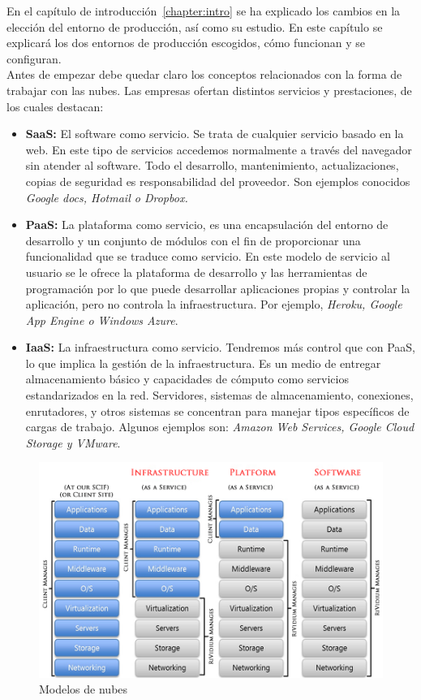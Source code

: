 
En el capítulo de introducción~\ref{chapter:intro} se ha explicado los cambios en la elección del entorno de producción, así como su estudio. En este capítulo se explicará los dos entornos de producción escogidos, cómo funcionan y se configuran. \\

Antes de empezar debe quedar claro los conceptos relacionados con la forma de trabajar con las nubes. Las empresas ofertan distintos servicios y prestaciones, de los cuales destacan:
\begin{itemize}
	\item \textbf{SaaS:} El software como servicio. Se trata de cualquier servicio basado en la web. En este tipo de servicios accedemos normalmente a través del navegador sin atender al software. Todo el desarrollo, mantenimiento, actualizaciones, copias de seguridad es responsabilidad del proveedor. Son ejemplos conocidos \emph{Google docs, Hotmail o Dropbox.}
	\item \textbf{PaaS:} La plataforma como servicio, es una encapsulación del entorno de desarrollo y un conjunto de módulos con el fin de proporcionar una funcionalidad que se traduce como servicio. En este modelo de servicio al usuario se le ofrece la plataforma de desarrollo y las herramientas de programación por lo que puede desarrollar aplicaciones propias y controlar la aplicación, pero no controla la infraestructura. Por ejemplo, \emph{Heroku, Google App Engine o Windows Azure}. 
	\item \textbf{IaaS:} La infraestructura como servicio. Tendremos más control que con PaaS, lo que implica la gestión de la infraestructura. Es un medio de entregar almacenamiento básico y capacidades de cómputo como servicios estandarizados en la red. Servidores, sistemas de almacenamiento, conexiones, enrutadores, y otros sistemas se concentran para manejar tipos específicos de cargas de trabajo. Algunos ejemplos son: \emph{Amazon Web Services, Google Cloud Storage y VMware}. 
\end{itemize}

\begin{figure}[H]
	\centering
	\includegraphics[width=12cm]{./images/cloud-models.png}
	\caption{Modelos de nubes} \label{fig:cloud-models}
\end{figure}

